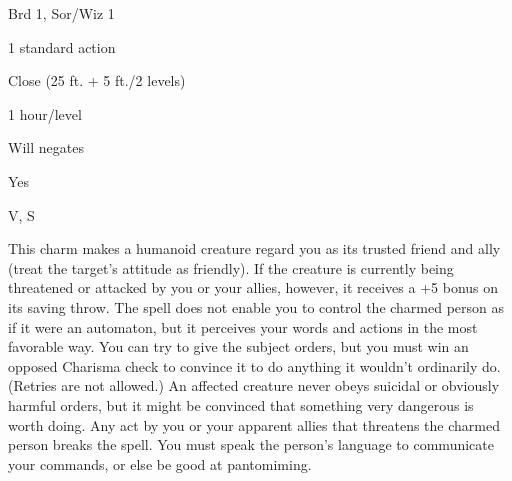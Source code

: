 
\begin{description*}
\item[Level:] Brd 1, Sor/Wiz 1
\item[Casting Time:] 1 standard action
\item[Range:] Close (25 ft. + 5 ft./2 levels)
\item[Duration:] 1 hour/level
\item[Saving Throw:] Will negates
\item[Spell Resistance:] Yes
\item[Components:] V, S
\end{description*}

This charm makes a humanoid creature regard you as its trusted friend and ally
(treat the target's attitude as friendly). If the creature is currently being threatened
or attacked by you or your allies, however, it receives a +5 bonus on its saving
throw.
The spell does not enable you to control the charmed person as if it were
an automaton, but it perceives your words and actions in the most favorable way.
You can try to give the subject orders, but you must win an opposed Charisma check
to convince it to do anything it wouldn't ordinarily do. (Retries are not allowed.)
An affected creature never obeys suicidal or obviously harmful orders, but it might
be convinced that something very dangerous is worth doing.  Any act by you or your
apparent allies that threatens the charmed person breaks the spell. You
must speak the person's language to communicate your commands, or else be good
at pantomiming.